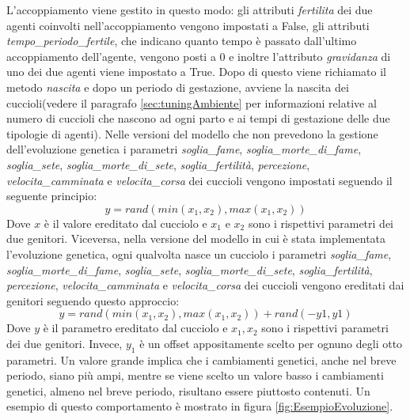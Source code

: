\documentclass[11pt]{article}
\begin{document}
L'accoppiamento viene gestito in questo modo: gli attributi \emph{fertilita} dei due agenti coinvolti nell'accoppiamento vengono impostati a False, gli attributi \emph{tempo\_periodo\_fertile}, che indicano quanto tempo è passato dall'ultimo accoppiamento dell'agente, vengono posti a 0 e inoltre l'attributo \emph{gravidanza} di uno dei due agenti viene impostato a True.
Dopo di questo viene richiamato il metodo \emph{nascita} e dopo un periodo di gestazione, avviene la nascita  dei cuccioli(vedere il paragrafo \ref{sec:tuningAmbiente} per informazioni relative al numero di cuccioli che nascono ad ogni parto e ai tempi di gestazione delle due tipologie di agenti). Nelle versioni del modello che non prevedono la gestione dell'evoluzione genetica i parametri \emph{soglia\_fame}, \emph{soglia\_morte\_di\_fame}, \emph{soglia\_sete}, \emph{soglia\_morte\_di\_sete}, \emph{soglia\_fertilità}, \emph{percezione}, \emph{velocita\_camminata} e \emph{velocita\_corsa} dei cuccioli vengono impostati seguendo il seguente principio: 
\[
    y = rand(min(x_1, x_2), max(x_1, x_2))
\]
Dove $x$ è il valore ereditato dal cucciolo e $x_1$ e $x_2$ sono i rispettivi parametri dei due genitori.  Viceversa, nella versione del modello in cui è stata implementata l'evoluzione genetica,
ogni qualvolta nasce un cucciolo i parametri \emph{soglia\_fame}, \emph{soglia\_morte\_di\_fame}, \emph{soglia\_sete}, \emph{soglia\_morte\_di\_sete}, \emph{soglia\_fertilità}, \emph{percezione}, \emph{velocita\_camminata} e \emph{velocita\_corsa} dei cuccioli vengono ereditati dai genitori seguendo questo approccio:
\[
    y = rand(min(x_1, x_2), max(x_1, x_2)) + rand(-y1, y1) 
\]
Dove $y$ è il parametro ereditato dal cucciolo e $x_1, x_2$ sono i rispettivi parametri dei due genitori. Invece, $y_1$ è un offset appositamente scelto per ognuno degli otto parametri. Un valore grande implica che i cambiamenti genetici, anche nel breve periodo, siano più ampi, mentre se viene scelto un valore basso i cambiamenti genetici, almeno nel breve periodo,  risultano essere piuttosto contenuti. 
Un esempio di questo comportamento è mostrato in figura \ref{fig:EsempioEvoluzione}. 
\end{document}
